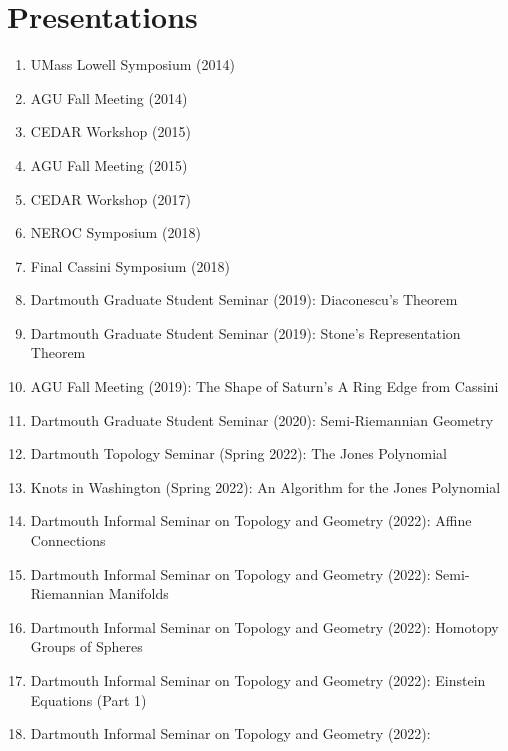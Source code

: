 \documentclass[letterpaper,sans]{moderncv}
\begin{document}
    \section{Presentations}
        \begin{enumerate}
            \item UMass Lowell Symposium (2014)
            \item AGU Fall Meeting (2014)
            \item CEDAR Workshop (2015)
            \item AGU Fall Meeting (2015)
            \item CEDAR Workshop (2017)
            \item NEROC Symposium (2018)
            \item Final Cassini Symposium (2018)
            \item
                Dartmouth Graduate Student Seminar (2019):
                Diaconescu's Theorem
            \item
                Dartmouth Graduate Student Seminar (2019):
                Stone's Representation Theorem
            \item
                AGU Fall Meeting (2019):
                The Shape of Saturn's A Ring Edge from Cassini
            \item
                Dartmouth Graduate Student Seminar (2020):
                Semi-Riemannian Geometry
            \item
                Dartmouth Topology Seminar (Spring 2022):
                The Jones Polynomial
            \item
                Knots in Washington (Spring 2022):
                An Algorithm for the Jones Polynomial
            \item
                Dartmouth Informal Seminar on Topology and Geometry (2022):
                Affine Connections
            \item
                Dartmouth Informal Seminar on Topology and Geometry (2022):
                Semi-Riemannian Manifolds
            \item
                Dartmouth Informal Seminar on Topology and Geometry (2022):
                Homotopy Groups of Spheres
            \item
                Dartmouth Informal Seminar on Topology and Geometry (2022):
                Einstein Equations (Part 1)
            \item
                Dartmouth Informal Seminar on Topology and Geometry (2022):

\end{enumerate}
\end{document}
